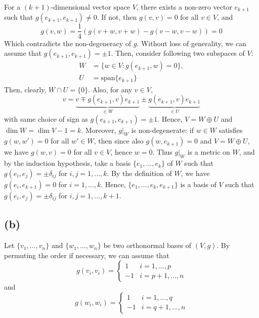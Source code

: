 \documentclass[a4paper,11pt]{article}
\begin{document}
For a $(k+1)$-dimensional vector space $V$, there exists a non-zero vector $e_{k+1}$ such that $g(e_{k+1}, e_{k+1}) \ne 0$. If not, then $g(v, v) = 0$ for all $v \in V$, and
\begin{equation}
    g(v, w) = \frac{1}{4}\left(g(v+w, v+w) - g(v-w, v-w)\right) = 0
\end{equation}
Which contradicts the non-degeneracy of $g$. Without loss of generality, we can assume that $g(e_{k+1}, e_{k+1}) =\pm1$. Then, consider following two subspaces of $V$:
\begin{align}
    W &= \{w \in V : g(e_{k+1}, w) = 0\}, \\
    U &= \text{span}\{e_{k+1}\}
\end{align}
Then, clearly, $W\cap U = \{0\}$. Also, for any $v\in V$,
\begin{equation}
    v = \underbrace{v \mp g(e_{k+1}, v) e_{k+1}}_{\in W} \pm \underbrace{g(e_{k+1}, v) e_{k+1}}_{\in U}
\end{equation}
with same choice of sign as $g(e_{k+1}, e_{k+1}) = \pm1$. Hence, $V = W\oplus U$ and $\dim W = \dim V - 1=k$. Moreover, $g|_W$ is non-degenerate: if $w\in W$ satisfies $g(w,w')=0$ for all $w'\in W$, then since also $g(w,e_{k+1})=0$ and $V=W\oplus U$, we have $g(w,v)=0$ for all $v\in V$, hence $w=0$. Thus $g|_W$ is a metric on $W$, and by the induction hypothesis, take a basis $\{e_1, \dots, e_k\}$ of $W$ such that $g(e_i, e_j) = \pm\delta_{ij}$ for $i, j = 1, \dots, k$. By the definition of $W$, we have $g(e_i, e_{k+1}) = 0$ for $i = 1, \dots, k$. Hence, $\{e_1, \dots, e_k, e_{k+1}\}$ is a basis of $V$ such that $g(e_i, e_j) = \pm\delta_{ij}$ for $i, j = 1, \dots, k+1$.
\subsection{(b)}

Let $\{v_1, \dots, v_n\}$ and $\{w_1, \dots, w_n\}$ be two orthonormal bases of $(V, g)$. By permuting the order if necessary, we can assume that 
\begin{equation}
    g(v_i, v_i) = \begin{cases}
        1 & i = 1, \dots, p \\
        -1 & i = p+1, \dots, n
    \end{cases}
\end{equation}
and
\begin{equation}
    g(w_i, w_i) = \begin{cases}
        1 & i = 1, \dots, q \\
        -1 & i = q+1, \dots, n
    \end{cases}
\end{equation}
\end{document}

